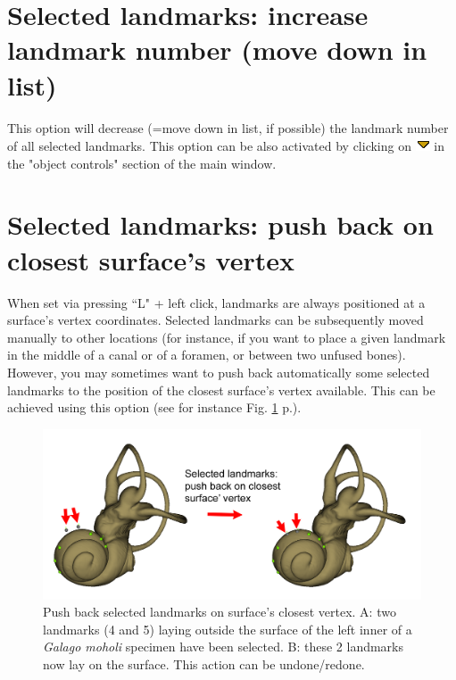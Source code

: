 \section{Selected landmarks: increase landmark number (move down in list)}
 This option will decrease (=move down in list, if possible) the landmark number of all selected landmarks.
This option can be also activated by clicking on \includegraphics[scale=0.7]{images/06/objects/move_down.png} in the "object controls" section of the main window.

\section{Selected landmarks: push back on closest surface's vertex}
When set via pressing ``L" + left click, landmarks are always positioned at a surface's vertex coordinates. Selected
landmarks can be subsequently moved manually to other locations (for instance, if you want to place
a given landmark in the middle of a canal or of a foramen, or between two unfused bones). However,
you may sometimes want to push back automatically some selected landmarks to the position of the
closest surface's vertex available. This can be achieved using this option (see for instance Fig. \ref{push_back} p.\pageref{push_back}).

\begin{figure}
  \centering
  \includegraphics[scale=0.27]{images/10/push_back.png} 
	\caption{Push back selected landmarks on surface's closest vertex. A: two landmarks (4 and 5) laying outside the surface of the left inner of a \textit{Galago moholi} specimen have been selected. B: these 2 landmarks now lay on the surface. This action can be undone/redone.}
\label{push_back}
 
\end{figure}


